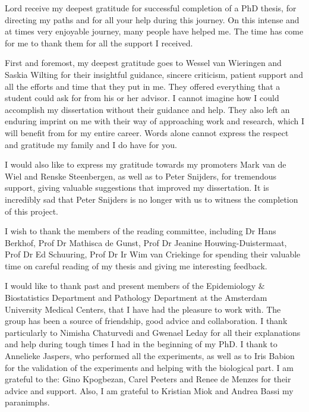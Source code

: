 
\begin{acknowledgements}      

Lord receive my deepest gratitude for successful completion of a PhD thesis, for directing my paths and for all your help during this journey. On this intense and at times very enjoyable journey, many people have helped me. The time has come for me to thank them for all the support I received.
				
First and foremost, my deepest gratitude goes to Wessel van Wieringen and Saskia Wilting for their insightful guidance, sincere criticism, patient support and all the efforts and time that they put in me. They offered everything that a student could ask for from his or her advisor. I cannot imagine how I could accomplish my dissertation without their guidance and help. They also left an enduring imprint on me with their way of approaching work and research, which I will benefit from for my entire career. Words alone cannot express the respect and gratitude my family and I do have for you.
					
I would also like to express my gratitude towards my promoters Mark van de Wiel and Renske Steenbergen, as well as to Peter Snijders, for tremendous support, giving valuable suggestions that improved my dissertation.  It is incredibly sad that Peter Snijders is no longer with us to witness the completion of this project.
				
I wish to thank the members of the reading committee, including Dr Hans Berkhof, Prof Dr Mathisca de Gunst, Prof Dr Jeanine Houwing-Duistermaat, Prof Dr Ed Schuuring, Prof Dr Ir Wim van Criekinge for spending their valuable time on careful reading of my thesis and giving me interesting feedback.
				
I would like to thank past and present members of the Epidemiology $\&$ Biostatistics Department  and Pathology Department at the Amsterdam University Medical Centers, that I have had the pleasure to work with. The group has been a source of friendship, good advice and collaboration. I thank particularly to Nimisha Chaturvedi and Gwenael Leday for all their explanations and help during tough times I had in the beginning of my PhD. I thank to Annelieke Jaspers, who performed all the experiments, as well as to Iris Babion for the validation of the experiments and helping with the biological part. I am grateful to the: Gino Kpogbezan, Carel Peeters and Renee de Menzes for their advice and support. Also, I am grateful to Kristian Miok and Andrea Bassi my paranimphs.
				

\end{acknowledgements}
